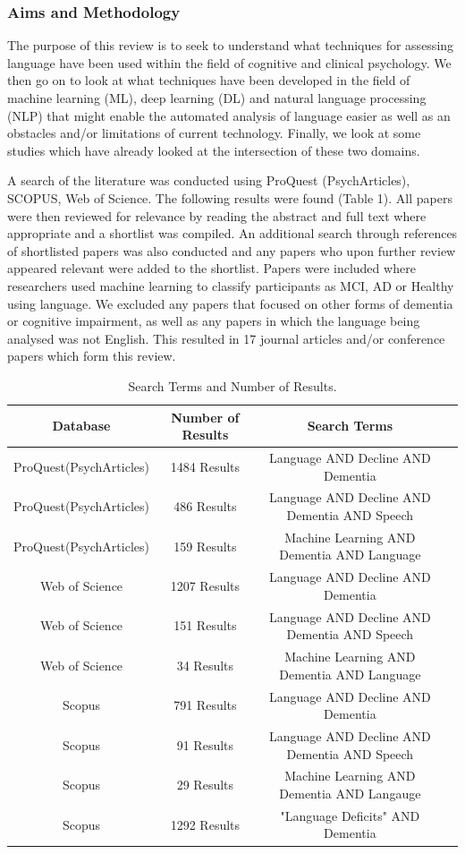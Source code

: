 \documentclass{article}
\begin{document}
\subsubsection{Aims and Methodology}
\par
The purpose of this review is to seek to understand what techniques for assessing language have been used within the field of cognitive and clinical psychology. We then go on to look at what techniques have been developed in the field of machine learning (ML), deep learning (DL) and natural language processing (NLP) that might enable the automated analysis of language easier as well as an obstacles and/or limitations of current technology. Finally, we look at some studies which have already looked at the intersection of these two domains. \newline
\par
A search of the literature was conducted using ProQuest (PsychArticles), SCOPUS, Web of Science. The following results were found (Table 1). All papers were then reviewed for relevance by reading the abstract and full text where appropriate and a shortlist was compiled. An additional search through references of shortlisted papers was also conducted and any papers who upon further review appeared relevant were added to the shortlist. Papers were included where researchers used machine learning to classify participants as MCI, AD or Healthy using language. We excluded any papers that focused on other forms of dementia or cognitive impairment, as well as any papers in which the language being analysed was not English. This resulted in 17 journal articles and/or conference papers which form this review.
\begin{table}
	\begin{tabular}{ | c | c | c | p{1cm} |}
		\hline
		Database & Number of Results & Search Terms  \\ \hline
		ProQuest(PsychArticles) & 1484 Results & Language AND Decline AND Dementia \\ \hline
		ProQuest(PsychArticles) & 486 Results  & Language AND Decline AND Dementia AND Speech \\ \hline
		ProQuest(PsychArticles) & 159 Results & Machine Learning AND Dementia AND Language \\ \hline
		Web of Science & 1207 Results  & Language AND Decline AND Dementia   \\ \hline
		Web of Science & 151 Results  & Language AND Decline AND Dementia AND Speech  \\ \hline
		Web of Science & 34 Results & Machine Learning AND Dementia AND Language \\ \hline
		Scopus & 791 Results & Language AND Decline AND Dementia  \\ \hline
		Scopus & 91 Results & Language AND Decline AND Dementia AND Speech   \\ \hline
		Scopus & 29 Results & Machine Learning AND Dementia AND Langauge \\ \hline
		Scopus & 1292 Results & "Language Deficits" AND Dementia \\ \hline
	\end{tabular}
	\caption{\label{tab:table-name}Search Terms and Number of Results.}
\end{table}
\end{document}
